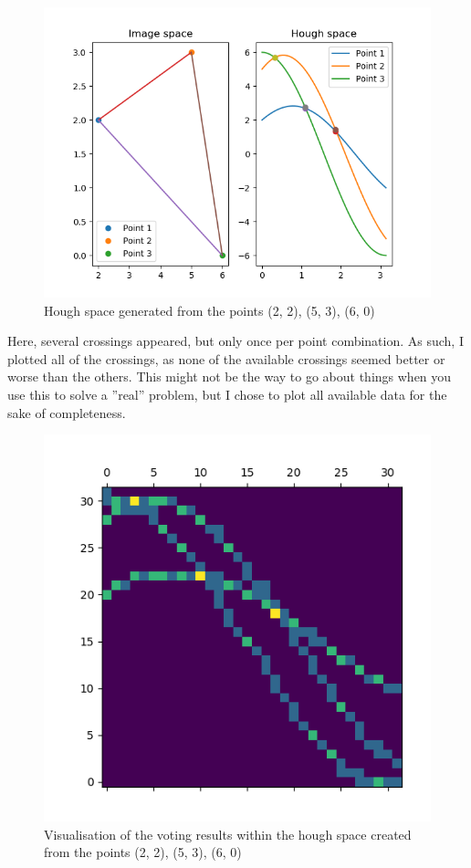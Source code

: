 \documentclass[a4paper, titlepage,12pt]{article}
\begin{document}
	\begin{figure}[h!]
		\begin{center}
		\includegraphics[scale=0.8]{./pts_2.png}
			\caption{Hough space generated from the points (2, 2), (5, 3), (6, 0)}
		\end{center}
	\end{figure}

	Here, several crossings appeared, but only once per point combination. As such, I plotted all of the crossings, as none of the available crossings seemed better or worse than the others. This might not be the way to go about things when you use this to solve a ''real'' problem, but I chose to plot all available data for the sake of completeness.

	\begin{figure}[H]
		\begin{center}
		\includegraphics[scale=0.8]{./voting.png}
			\caption{Visualisation of the voting results within the hough space created from the points (2, 2), (5, 3), (6, 0)}
		\end{center}
	\end{figure}
\end{document}
